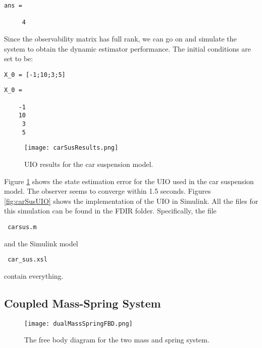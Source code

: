\documentclass{amsart}
\theoremstyle{definition}
\theoremstyle{remark}
\numberwithin{equation}{section}
\begin{document}
        \color{lightgray} \begin{verbatim}
ans =

     4

\end{verbatim} \color{black}
    
Since the observability matrix has full rank, we can go on and simulate the system to obtain the dynamic estimator performance. The initial conditions are set to be: 

\begin{verbatim}
X_0 = [-1;10;3;5]
\end{verbatim}

        \color{lightgray} \begin{verbatim}
X_0 =

    -1
    10
     3
     5

\end{verbatim} \color{black}

\begin{figure}
    \centering
    \texttt{[image: carSusResults.png]}
    \caption{UIO results for the car suspension model.}
    \label{fig:carSusResults}
\end{figure}

Figure \ref{fig:carSusResults} shows the state estimation error for the UIO used in the car suspension model. The observer seems to converge within 1.5 seconds.  Figures \ref{fig:carSusUIO} shows the implementation of the UIO in Simulink.  All the files for this simulation can be found in the \color{lightgray}FDIR \color{black} folder. Specifically, the file \begin{verbatim} carsus.m \end{verbatim} and the Simulink model \begin{verbatim} car_sus.xsl \end{verbatim} contain everything. 

\subsection{Coupled Mass-Spring System}

\begin{figure}[H]
    \centering
    \texttt{[image: dualMassSpringFBD.png]}
    \caption{The free body diagram for the two mass and spring system.}
    \label{fig:dualMS}
\end{figure}
\end{document}
